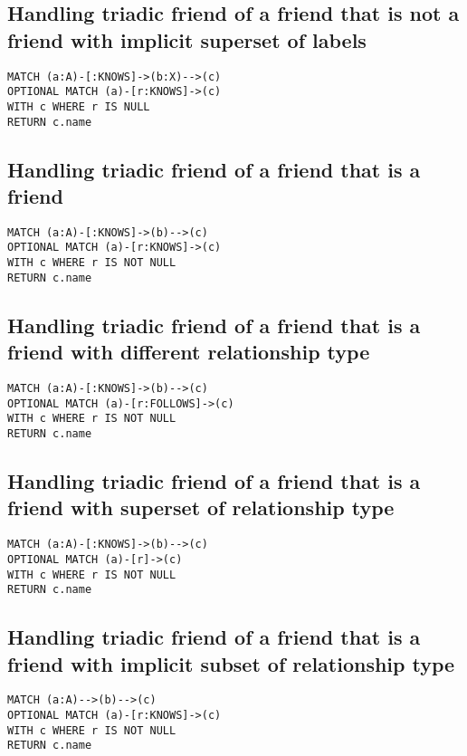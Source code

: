 \subsection{Handling triadic friend of a friend that is not a friend with implicit superset of labels}

\begin{lstlisting}
MATCH (a:A)-[:KNOWS]->(b:X)-->(c)
OPTIONAL MATCH (a)-[r:KNOWS]->(c)
WITH c WHERE r IS NULL
RETURN c.name
\end{lstlisting}

\subsection{Handling triadic friend of a friend that is a friend}

\begin{lstlisting}
MATCH (a:A)-[:KNOWS]->(b)-->(c)
OPTIONAL MATCH (a)-[r:KNOWS]->(c)
WITH c WHERE r IS NOT NULL
RETURN c.name
\end{lstlisting}

\subsection{Handling triadic friend of a friend that is a friend with different relationship type}

\begin{lstlisting}
MATCH (a:A)-[:KNOWS]->(b)-->(c)
OPTIONAL MATCH (a)-[r:FOLLOWS]->(c)
WITH c WHERE r IS NOT NULL
RETURN c.name
\end{lstlisting}

\subsection{Handling triadic friend of a friend that is a friend with superset of relationship type}

\begin{lstlisting}
MATCH (a:A)-[:KNOWS]->(b)-->(c)
OPTIONAL MATCH (a)-[r]->(c)
WITH c WHERE r IS NOT NULL
RETURN c.name
\end{lstlisting}

\subsection{Handling triadic friend of a friend that is a friend with implicit subset of relationship type}

\begin{lstlisting}
MATCH (a:A)-->(b)-->(c)
OPTIONAL MATCH (a)-[r:KNOWS]->(c)
WITH c WHERE r IS NOT NULL
RETURN c.name
\end{lstlisting}

